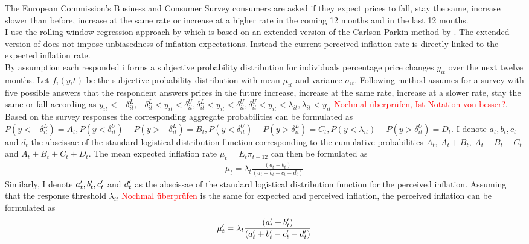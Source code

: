 \documentclass[review]{elsarticle}
\begin{document}
The European Commission's Business and Consumer Survey consumers are asked if they expect prices to fall, stay the same, increase slower than before, increase at the same rate or increase at a higher rate in the coming 12 months and in the last 12 months. 
\\
I use the rolling-window-regression approach by \cite{Lahiri2015} which is based on an extended version of the Carlson-Parkin method \citep{Carlson1975} by \cite{Berk1999}. The extended version of \cite{Berk1999} does not impose unbiasedness of inflation expectations. Instead the current perceived inflation rate is directly linked to the expected inflation rate.  
\\
By assumption each responded i forms a subjective probability distribution for individuals percentage price changes $y_{it}$ over the next twelve months. Let $f_i(y{_it})$ be the subjective probability distribution with mean $\mu_{it}$ and variance $\sigma_{it}$. Following \cite{Batchelor1988} method assumes for a survey with five possible answers that the respondent answers prices in the future increase, increase at the same rate, increase at a slower rate, stay the same or fall according as $ y_{it} < - \delta_{it}^L, - \delta_{it}^L < y_{it} < \delta_{it}^U , \delta_{it}^L < y_{it} < \delta_{it}^U,  \delta_{it}^U < y_{it} < \lambda_{it}, \lambda_{it} < y_{it}$ \textcolor{red}{Nochmal überprüfen, Ist Notation von \cite{Batchelor1988} besser?}. Based on the survey responses the corresponding aggregate probabilities can be formulated as $P(y <  -\delta_{it}^L) = A_t, P(y < \delta_{it}^U) - P(y > - \delta_{it}^L) = B_t, P(y < \delta_{it}^U) - P(y > \delta_{it}^L) = C_t, P(y < \lambda_{it}) - P(y > \delta_{it}^U) = D_t.$ I denote $a_t, b_t, c_t$ and $ d_t$ the abscissae of the standard logistical distribution function corresponding to the cumulative probabilities $A_t, \ A_t + B_t, \ A_t + B_t + C_t$ and $A_t + B_t + C_t + D_t$. The mean expected inflation rate $\mu_t = E_t \pi_{t+12}$ can then be formulated as 
\begin{align*}
\mu_t = \lambda_t \frac{(a_t + b_t)}{(a_t + b_t - c_t - d_t)}
\end{align*}
Similarly, I denote $a_t\sp{\prime}, b_t\sp{\prime}, c_t\sp{\prime}$ and $ d_t\sp{\prime}$ as the abscissae of the standard logistical distribution function for the perceived inflation. Assuming that the response threshold $\lambda_{it}$ \textcolor{red}{Nochmal überprüfen} is the same for expected and perceived inflation, the perceived inflation can be formulated as 
\begin{align*}
\mu_t\sp{\prime} = \lambda_t \frac{(a_t\sp{\prime} + b_t\sp{\prime})}{(a_t\sp{\prime} + b_t\sp{\prime} - c_t\sp{\prime} - d_t\sp{\prime})}
\end{align*}
\end{document}
